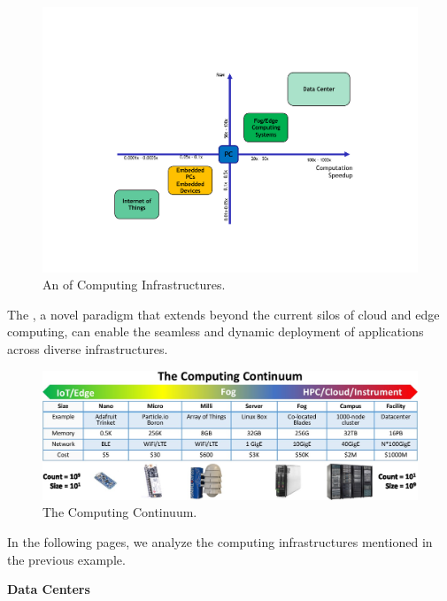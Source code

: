 \begin{figure}[!htp]
    \centering
    \includegraphics[width=\textwidth]{img/example-computing-infrastructure-1.pdf}
    \caption{An  of Computing Infrastructures.\cite{computing-infrastructures-slides}}
\end{figure}

\noindent
The , a novel paradigm that extends beyond the current silos of cloud and edge computing, can enable the seamless and dynamic deployment of applications across diverse infrastructures.\cite{marino2023computing}

\newpage

\begin{figure}[!htp]
    \centering
    \includegraphics[width=\textwidth]{img/computing-continuum-1.png}
    \caption{The Computing Continuum.\cite{computing-infrastructures-slides}}
\end{figure}

\noindent
In the following pages, we analyze the computing infrastructures mentioned in the previous example.

\longline

\begin{center}
    \large
    \textcolor{Red3}{\textbf{Data Centers}}
\end{center}

